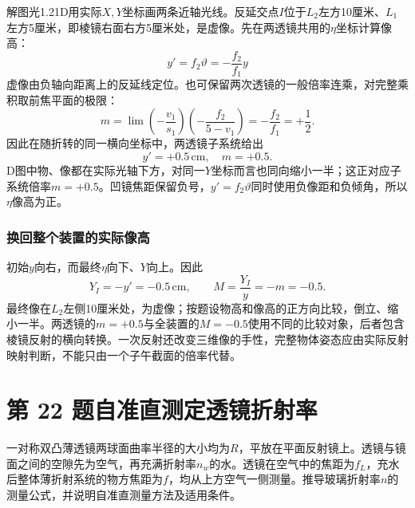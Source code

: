 \documentclass[UTF8,fontset=fandol,a4paper,11pt]{ctexart}
\begin{document}
解图光1.21D用实际$X,Y$坐标画两条近轴光线。反延交点$I$位于$L_2$左方10厘米、$L_1$左方5厘米，即棱镜右面右方5厘米处，是虚像。先在两透镜共用的$\eta$坐标计算像高：
\[
y'=f_2\vartheta=-\frac{f_2}{f_1}y
\]
虚像由负轴向距离上的反延线定位。也可保留两次透镜的一般倍率连乘，对完整乘积取前焦平面的极限：
\[
m=\lim\left(-\frac{v_1}{s_1}\right)
\left(-\frac{f_2}{5-v_1}\right)
=-\frac{f_2}{f_1}=+\frac12.
\]
因此在随折转的同一横向坐标中，两透镜子系统给出
\[
\boxed{y'=+0.5\,\mathrm{cm},\quad m=+0.5}.
\]
D图中物、像都在实际光轴下方，对同一$Y$坐标而言也同向缩小一半；这正对应子系统倍率$m=+0.5$。凹镜焦距保留负号，$y'=f_2\vartheta$同时使用负像距和负倾角，所以$\eta$像高为正。

\subsubsection*{换回整个装置的实际像高}
初始$y$向右，而最终$\eta$向下、$Y$向上。因此
\[
Y_I=-y'=-0.5\,\mathrm{cm},\qquad
\boxed{M=\frac{Y_I}{y}=-m=-0.5}.
\]
最终像在$L_2$左侧10厘米处，为虚像；按题设物高和像高的正方向比较，倒立、缩小一半。两透镜的$m=+0.5$与全装置的$M=-0.5$使用不同的比较对象，后者包含棱镜反射的横向转换。一次反射还改变三维像的手性，完整物体姿态应由实际反射映射判断，不能只由一个子午截面的倍率代替。




\section*{第 22 题\quad 自准直测定透镜折射率}\label{q:22}

一对称双凸薄透镜两球面曲率半径的大小均为$R$，平放在平面反射镜上。透镜与镜面之间的空隙先为空气，再充满折射率$n_w$的水。透镜在空气中的焦距为$f_L$，充水后整体薄折射系统的物方焦距为$f$，均从上方空气一侧测量。推导玻璃折射率$n$的测量公式，并说明自准直测量方法及适用条件。
\end{document}
